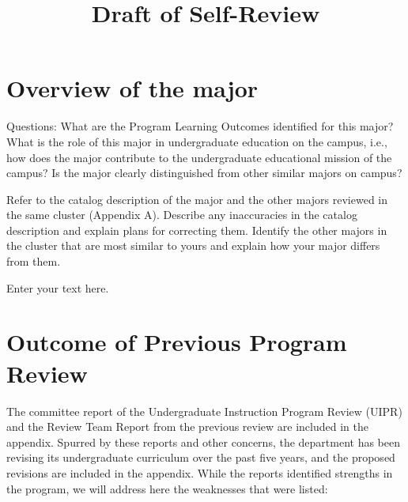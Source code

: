 \documentclass[12pt]{article}
\begin{document}


\title{Draft of Self-Review}

\maketitle

\section{Overview of the major}

Questions: What are the Program Learning Outcomes identified for this major? What is the role of this major in undergraduate education on the campus, i.e., how does the major contribute to the undergraduate educational mission of the campus? Is the major clearly distinguished from other similar majors on campus?

Refer to the catalog description of the major and the other majors reviewed in the same cluster (Appendix A). Describe any inaccuracies in the catalog description and explain plans for correcting them. Identify the other majors in the cluster that are most similar to yours and explain how your major differs from them.

Enter your text here.

\section{Outcome of Previous Program Review}

The committee report of the Undergraduate Instruction Program Review
(UIPR) and the Review Team Report from the previous review are
included in the appendix.  Spurred by these reports and other
concerns, the department has been revising its undergraduate curriculum
over the past five years, and the proposed revisions are included in
the appendix. While the reports identified strengths in
the program, we will address here the weaknesses that were listed:
\end{document}
